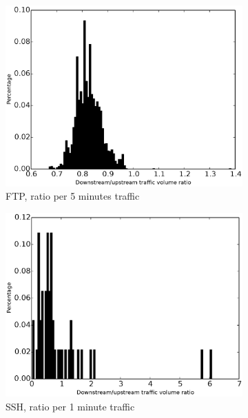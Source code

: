 \begin{figure}
\begin{subfigure}{0.32\linewidth}
\includegraphics[width=\linewidth]{image/ratio_downstream_upstream_traffic_volume_ftp.eps}
\caption{FTP, ratio per 5 minutes traffic}
\label{ratio_downstream_upstream_traffic_volume_ftp}
\end{subfigure}
\begin{subfigure}{0.32\linewidth}
\includegraphics[width=\linewidth]{image/ratio_downstream_upstream_traffic_volume_ssh.eps}
\caption{SSH, ratio per 1 minute traffic}
\label{ratio_downstream_upstream_traffic_volume_ssh}
\end{subfigure}
\begin{subfigure}{0.32\linewidth}

\end{subfigure}
\end{figure}
